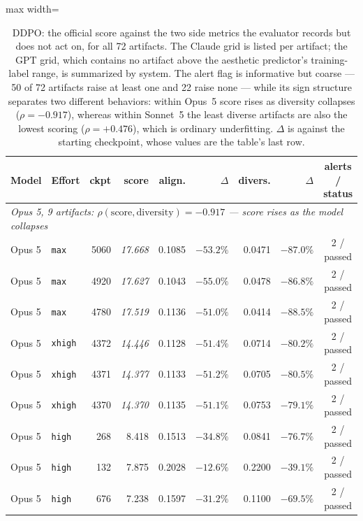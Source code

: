 \begin{table}[t]
\centering
\caption{DDPO: the official score against the two side metrics the evaluator records but does
not act on, for all 72 artifacts. The Claude grid is listed per artifact; the GPT grid, which
contains no artifact above the aesthetic predictor's training-label range, is summarized by
system. The alert flag is informative but coarse --- 50 of 72 artifacts raise at least one and
22 raise none --- while its sign structure separates two different behaviors: within Opus~5
score rises as diversity collapses ($\rho=-0.917$), whereas within Sonnet~5 the least diverse
artifacts are also the lowest scoring ($\rho=+0.476$), which is ordinary underfitting.
$\Delta$ is against the starting checkpoint, whose values are the table's last row.}
\label{tab:ddpo}
\small
\begin{adjustbox}{max width=\linewidth}
\begin{tabular}{llrrrrrrc}
\toprule
\textbf{Model} & \textbf{Effort} & \textbf{ckpt} & \textbf{score} & \textbf{align.} & \textbf{$\Delta$} & \textbf{divers.} & \textbf{$\Delta$} & \textbf{alerts / status} \\
\midrule
\multicolumn{9}{l}{\emph{Opus 5, 9 artifacts: $\rho(\text{score},\text{diversity})=-0.917$ --- score rises as the model collapses}} \\
Opus 5   & \texttt{max}    & 5060 & \emph{17.668} & 0.1085 & $-53.2\%$ & 0.0471 & $-87.0\%$ & 2 / passed \\
Opus 5   & \texttt{max}    & 4920 & \emph{17.627} & 0.1043 & $-55.0\%$ & 0.0478 & $-86.8\%$ & 2 / passed \\
Opus 5   & \texttt{max}    & 4780 & \emph{17.519} & 0.1136 & $-51.0\%$ & 0.0414 & $-88.5\%$ & 2 / passed \\
Opus 5   & \texttt{xhigh}  & 4372 & \emph{14.446} & 0.1128 & $-51.4\%$ & 0.0714 & $-80.2\%$ & 2 / passed \\
Opus 5   & \texttt{xhigh}  & 4371 & \emph{14.377} & 0.1133 & $-51.2\%$ & 0.0705 & $-80.5\%$ & 2 / passed \\
Opus 5   & \texttt{xhigh}  & 4370 & \emph{14.370} & 0.1135 & $-51.1\%$ & 0.0753 & $-79.1\%$ & 2 / passed \\
Opus 5   & \texttt{high}   &  268 & 8.418  & 0.1513 & $-34.8\%$ & 0.0841 & $-76.7\%$ & 2 / passed \\
Opus 5   & \texttt{high}   &  132 & 7.875  & 0.2028 & $-12.6\%$ & 0.2200 & $-39.1\%$ & 2 / passed \\
Opus 5   & \texttt{high}   &  676 & 7.238  & 0.1597 & $-31.2\%$ & 0.1100 & $-69.5\%$ & 2 / passed \\

\end{tabular}
\end{adjustbox}
\end{table}
